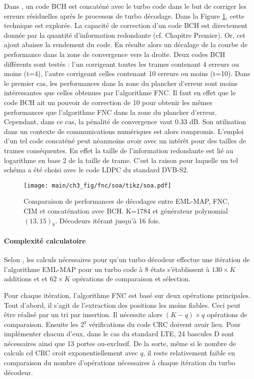 Dans \cite{andersenBCH}, un code BCH est concaténé avec le turbo code dans le but de corriger les erreurs résiduelles 
après le processus de turbo décodage. Dans la Figure \ref{fig:fnc_soa}, cette technique est explorée. La capacité de 
correction d'un code BCH est directement donnée par la quantité d'information redondante (cf. Chapitre Premier). Or, cet 
ajout abaisse la rendement du code. En résulte alors un décalage de la courbe de performance dans la zone de convergence 
vers la droite. Deux codes BCH différents sont testés : l'un corrigeant toutes les trames contenant 4 erreurs ou moins (t=4), l'autre 
corrigeant celles contenant 10 erreurs ou moins (t=10). Dans le premier cas, les performances dans la zone du plancher 
d'erreur sont moins intéressantes que celles obtenues par l'algorithme FNC. Il faut en effet que le code BCH ait un pouvoir
de correction de 10 pour obtenir les mêmes performances que l'algorithme FNC dans la zone du plancher d'erreur. Cependant, 
dans ce cas, la pénalité de convergence vaut 0.33 dB. Son utilisation dans un contexte de communications numériques 
est alors compromis. L'emploi d'un tel code concaténé peut néanmoins avoir avec un intérêt pour des tailles de trames
conséquentes. En effet la taille de l'information redondante est lié au logarithme en base 2 de la taille de trame.
C'est la raison pour laquelle un tel schéma a été choisi avec le code LDPC du standard DVB-S2.

\begin{figure}[!htb]
	\centering
	\texttt{[image: main/ch3\_fig/fnc/soa/tikz/soa.pdf]}
	\caption{Comparaison de performances de décodages entre EML-MAP, FNC, CIM et concaténation avec BCH. K=1784 et générateur
	polynomial $(13,15)_8$.	Décodeurs itérant jusqu'à 16 fois. \label{fig:fnc_soa}}
\end{figure}

\paragraph*{Complexité calculatoire} Selon \cite{david_gnaedig_thesis}, les calculs nécessaires pour qu'un turbo décodeur 
effectue une itération de l'algorithme EML-MAP pour un turbo code à 8 états s'établissent à $130\times K$ additions et 
et $62\times K$ opérations de comparaison et sélection.

Pour chaque itération, l'algorithme FNC est basé sur deux opérations principales. Tout d'abord, il s'agit de l'extraction 
des positions les moins fiables. Ceci peut être réalisé par un tri par insertion. Il nécessite alors $(K-q)\times q$ 
opérations de comparaison. Ensuite les $2^q$ vérifications du code CRC doivent avoir lieu. Pour implémenter chacun d'eux,
dans le cas du standard LTE, 24 bascules D sont nécessaires ainsi que 13 portes ou-exclusif. De la sorte, même si le 
nombre de calculs cd CRC croit exponentiellement avec $q$, il reste relativement faible en comparaison du nombre 
d'opérations nécessaires à chaque itération du turbo décodeur.

